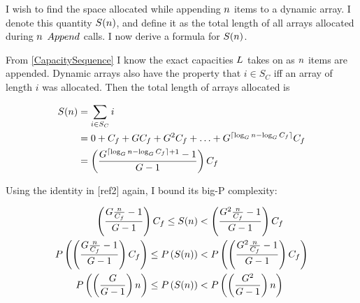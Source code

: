 \HdrSpaceComplex

I wish to find the space allocated while appending $n$ items to a dynamic array. I denote this quantity $S(n)$, and define it as the total length of all arrays allocated during $n$ $Append$ calls. I now derive a formula for $S(n)$.

From \ref{CapacitySequence} I know the exact capacities $L$ takes on as $n$ items are appended. Dynamic arrays also have the property that $i \in S_C$ iff an array of length $i$ was allocated. Then the total length of arrays allocated is

\begin{align*}
S(n) &= \sum_{i \in S_C} i\\
&= 0 + C_f + GC_f + G^2C_f + \ldots + G^{\lceil \log_{G} n - \log_{G} C_f \rceil}C_f\\
&= \left( \frac{G^{\lceil \log_{G} n - \log_{G} C_f \rceil + 1} - 1}{G - 1} \right) C_f
\end{align*}

Using the identity in [ref2] again, I bound its big-P complexity:

\begin{align*}
\left( \frac{G \frac{n}{C_f} - 1}{G - 1} \right) C_f \leq S(n) &< \left( \frac{G^2 \frac{n}{C_f} - 1}{G - 1} \right) C_f\\
P\left( \left( \frac{G \frac{n}{C_f} - 1}{G - 1} \right) C_f \right) \leq P\left( S(n) \right) &< P\left( \left( \frac{G^2 \frac{n}{C_f} - 1}{G - 1} \right) C_f \right)\\
P\left( \left( \frac{G}{G - 1} \right) n \right) \leq P\left( S(n) \right) &< P\left( \left( \frac{G^2}{G - 1} \right) n \right)
\end{align*}